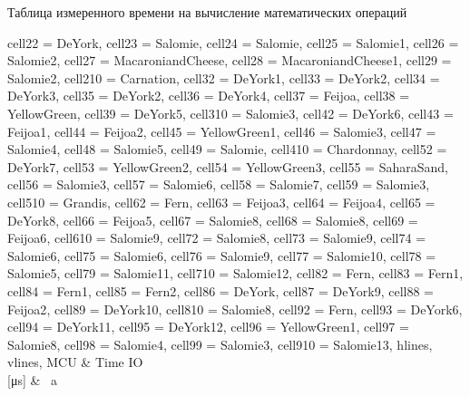 \begin{table}[H]
	\centering
	\caption{Таблица измеренного времени на вычисление математических операций}\label{TestTimeT}

	\begin{adjustbox}{width=\textwidth}

		\begin{tblr}{
				cell{2}{2} = {DeYork},
				cell{2}{3} = {Salomie},
				cell{2}{4} = {Salomie},
				cell{2}{5} = {Salomie1},
				cell{2}{6} = {Salomie2},
				cell{2}{7} = {MacaroniandCheese},
				cell{2}{8} = {MacaroniandCheese1},
				cell{2}{9} = {Salomie2},
				cell{2}{10} = {Carnation},
				cell{3}{2} = {DeYork1},
				cell{3}{3} = {DeYork2},
				cell{3}{4} = {DeYork3},
				cell{3}{5} = {DeYork2},
				cell{3}{6} = {DeYork4},
				cell{3}{7} = {Feijoa},
				cell{3}{8} = {YellowGreen},
				cell{3}{9} = {DeYork5},
				cell{3}{10} = {Salomie3},
				cell{4}{2} = {DeYork6},
				cell{4}{3} = {Feijoa1},
				cell{4}{4} = {Feijoa2},
				cell{4}{5} = {YellowGreen1},
				cell{4}{6} = {Salomie3},
				cell{4}{7} = {Salomie4},
				cell{4}{8} = {Salomie5},
				cell{4}{9} = {Salomie},
				cell{4}{10} = {Chardonnay},
				cell{5}{2} = {DeYork7},
				cell{5}{3} = {YellowGreen2},
				cell{5}{4} = {YellowGreen3},
				cell{5}{5} = {SaharaSand},
				cell{5}{6} = {Salomie3},
				cell{5}{7} = {Salomie6},
				cell{5}{8} = {Salomie7},
				cell{5}{9} = {Salomie3},
				cell{5}{10} = {Grandis},
				cell{6}{2} = {Fern},
				cell{6}{3} = {Feijoa3},
				cell{6}{4} = {Feijoa4},
				cell{6}{5} = {DeYork8},
				cell{6}{6} = {Feijoa5},
				cell{6}{7} = {Salomie8},
				cell{6}{8} = {Salomie8},
				cell{6}{9} = {Feijoa6},
				cell{6}{10} = {Salomie9},
				cell{7}{2} = {Salomie8},
				cell{7}{3} = {Salomie9},
				cell{7}{4} = {Salomie6},
				cell{7}{5} = {Salomie6},
				cell{7}{6} = {Salomie9},
				cell{7}{7} = {Salomie10},
				cell{7}{8} = {Salomie5},
				cell{7}{9} = {Salomie11},
				cell{7}{10} = {Salomie12},
				cell{8}{2} = {Fern},
				cell{8}{3} = {Fern1},
				cell{8}{4} = {Fern1},
				cell{8}{5} = {Fern2},
				cell{8}{6} = {DeYork},
				cell{8}{7} = {DeYork9},
				cell{8}{8} = {Feijoa2},
				cell{8}{9} = {DeYork10},
				cell{8}{10} = {Salomie8},
				cell{9}{2} = {Fern},
				cell{9}{3} = {DeYork6},
				cell{9}{4} = {DeYork11},
				cell{9}{5} = {DeYork12},
				cell{9}{6} = {YellowGreen1},
				cell{9}{7} = {Salomie8},
				cell{9}{8} = {Salomie4},
				cell{9}{9} = {Salomie3},
				cell{9}{10} = {Salomie13},
				hlines,
				vlines,
			}
			MCU                                 & {Time IO\\{[}μs]} & {~a~
}
\end{tblr}
\end{adjustbox}
\end{table}
